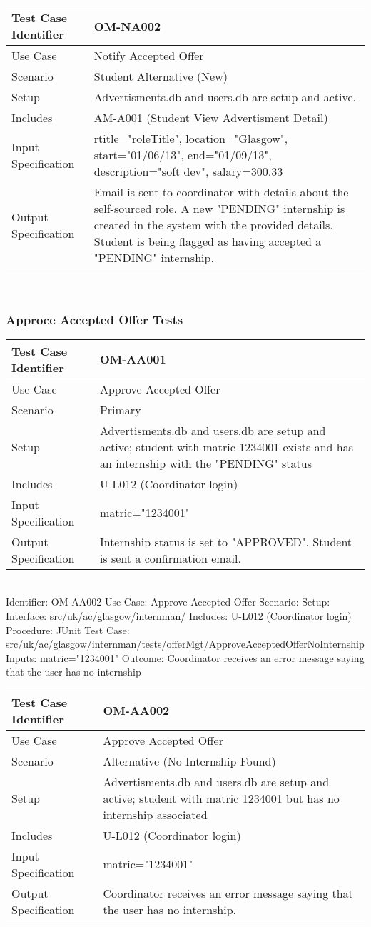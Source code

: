 \documentclass{l3deliverable}
\begin{document}
\begin{tabular}{lp{10cm}}
\hline 
\textbf{Test Case Identifier} & OM-NA002\tabularnewline
\hline 
\hline 
Use Case & Notify Accepted Offer \tabularnewline
\hline 
Scenario & Student Alternative (New) \tabularnewline
\hline 
Setup & Advertisments.db and users.db are setup and active.\tabularnewline
\hline 
Includes & AM-A001 (Student View Advertisment Detail) \tabularnewline
\hline 
Input Specification & rtitle="roleTitle", location="Glasgow", start="01/06/13", end="01/09/13", description="soft dev", salary=300.33 \tabularnewline
\hline 
Output Specification & Email is sent to coordinator with details about the self-sourced role. A new "PENDING" internship is created in the system with the provided details. Student is being flagged as having accepted a "PENDING" internship.\tabularnewline
\hline 
\end{tabular}\\

\subsubsection{Approce Accepted Offer Tests}

\begin{tabular}{lp{10cm}}
\hline 
\textbf{Test Case Identifier} & OM-AA001\tabularnewline
\hline 
\hline 
Use Case & Approve Accepted Offer\tabularnewline
\hline 
Scenario & Primary \tabularnewline
\hline 
Setup & Advertisments.db and users.db are setup and active; student with matric 1234001 exists and has an internship with the "PENDING" status\tabularnewline
\hline 
Includes & U-L012 (Coordinator login) \tabularnewline
\hline 
Input Specification &  matric="1234001" \tabularnewline
\hline 
Output Specification & Internship status is set to "APPROVED". Student is sent a confirmation email.\tabularnewline
\hline 
\end{tabular}\\

Identifier: OM-AA002
Use Case: Approve Accepted Offer
Scenario: 
Setup: 
Interface: src/uk/ac/glasgow/internman/
Includes: U-L012 (Coordinator login)
Procedure: JUnit Test Case: src/uk/ac/glasgow/internman/tests/offerMgt/ApproveAcceptedOfferNoInternship
Inputs: matric="1234001"
Outcome: Coordinator receives an error message saying that the user has no internship


\begin{tabular}{lp{10cm}}
\hline 
\textbf{Test Case Identifier} & OM-AA002\tabularnewline
\hline 
\hline 
Use Case & Approve Accepted Offer\tabularnewline
\hline 
Scenario & Alternative (No Internship Found) \tabularnewline
\hline 
Setup & Advertisments.db and users.db are setup and active; student with matric 1234001 but has no internship associated\tabularnewline
\hline 
Includes & U-L012 (Coordinator login) \tabularnewline
\hline 
Input Specification &  matric="1234001" \tabularnewline
\hline 
Output Specification & Coordinator receives an error message saying that the user has no internship. \tabularnewline
\hline 
\end{tabular}\\
\end{document}
